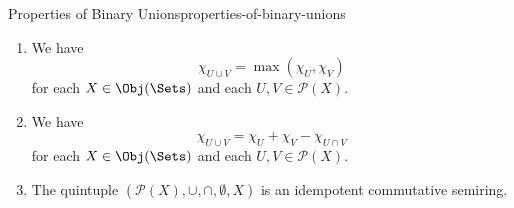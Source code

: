 \begin{proposition}{Properties of Binary Unions}{properties-of-binary-unions}
\begin{enumerate}
\begin{align*}
                U\cup(V\cap W)  &= (U\cup V)\cap(U\cup W),\\
                (U\cap V)\cup W &= (U\cup W)\cap(V\cup W)
            \end{align*}
            for each $X\in\Obj(\Sets)$ and each $U,V,W\in\mathcal{P}(X)$.
        \item\label{properties-of-binary-unions-interaction-with-characteristic-functions-1}We have
            \[
                \chi_{U\cup V}%
                =%
                \max(\chi_{U},\chi_{V})%
            \]%
            for each $X\in\Obj(\Sets)$ and each $U,V\in\mathcal{P}(X)$.
        \item\label{properties-of-binary-unions-interaction-with-characteristic-functions-2}We have
            \[
                \chi_{U\cup V}%
                =%
                \chi_{U}+\chi_{V}-\chi_{U\cap V}%
            \]%
            for each $X\in\Obj(\Sets)$ and each $U,V\in\mathcal{P}(X)$.
        \item\label{properties-of-binary-unions-interaction-with-powersets-and-semirings}The quintuple $(\mathcal{P}(X),\cup,\cap,\emptyset,X)$ is an idempotent commutative semiring.
    \end{enumerate}
\end{proposition}
